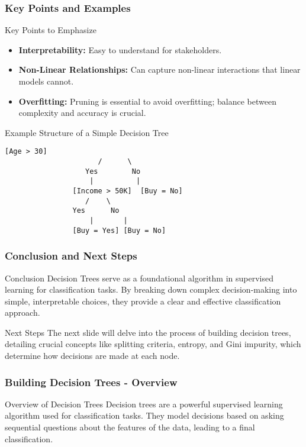 \documentclass[aspectratio=169]{beamer}
\begin{document}
\begin{frame}[fragile]
  \frametitle{Key Points and Examples}

  \begin{block}{Key Points to Emphasize}
    \begin{itemize}
      \item \textbf{Interpretability:} Easy to understand for stakeholders.
      \item \textbf{Non-Linear Relationships:} Can capture non-linear interactions that linear models cannot.
      \item \textbf{Overfitting:} Pruning is essential to avoid overfitting; balance between complexity and accuracy is crucial.
    \end{itemize}
  \end{block}

  \begin{block}{Example Structure of a Simple Decision Tree}
    \begin{lstlisting}[basicstyle=\tiny]
                      [Age > 30]
                      /      \
                   Yes        No
                    |          |
                [Income > 50K]  [Buy = No]
                   /    \
                Yes      No
                    |       |
                [Buy = Yes] [Buy = No]
    \end{lstlisting}
  \end{block}
\end{frame}

\begin{frame}[fragile]
  \frametitle{Conclusion and Next Steps}

  \begin{block}{Conclusion}
    Decision Trees serve as a foundational algorithm in supervised learning for classification tasks. By breaking down complex decision-making into simple, interpretable choices, they provide a clear and effective classification approach.
  \end{block}

  \begin{block}{Next Steps}
    The next slide will delve into the process of building decision trees, detailing crucial concepts like splitting criteria, entropy, and Gini impurity, which determine how decisions are made at each node.
  \end{block}
\end{frame}

\begin{frame}[fragile]
    \frametitle{Building Decision Trees - Overview}
    \begin{block}{Overview of Decision Trees}
        Decision trees are a powerful supervised learning algorithm used for classification tasks. 
        They model decisions based on asking sequential questions about the features of the data, leading to a final classification.
    \end{block}
\end{frame}
\end{document}
